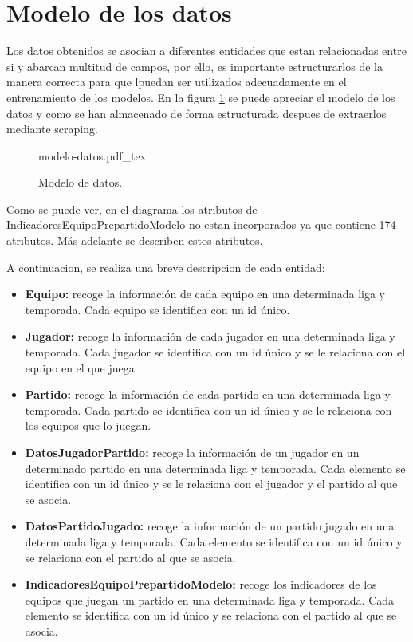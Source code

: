 \section{Modelo de los datos}
Los datos obtenidos se asocian a diferentes entidades que estan relacionadas entre si y abarcan multitud de campos, por ello, es importante estructurarlos de la manera correcta para que lpuedan ser utilizados adecuadamente en el entrenamiento de los modelos. En la figura \ref{fig:modelo-datos} se puede apreciar el modelo de los datos y como se han almacenado de forma estructurada despues de extraerlos mediante scraping.

\begin{figure}
    \centering
    \begin{normalsize}
        {modelo-datos.pdf_tex}
    \end{normalsize}
    \caption{Modelo de datos.}
    \label{fig:modelo-datos}

\end{figure}

Como se puede ver, en el diagrama los atributos de IndicadoresEquipoPrepartidoModelo no estan incorporados ya que contiene 174 atributos. Más adelante se describen estos atributos.

A continuacion, se realiza una breve descripcion de cada entidad:
\begin{itemize}
    \item \textbf{Equipo:} recoge la información de cada equipo en una determinada liga y temporada. Cada equipo se identifica con un id único.
    \item \textbf{Jugador:} recoge la información de cada jugador en una determinada liga y temporada.
          Cada jugador se identifica con un id único y se le relaciona con el equipo en el que juega.
    \item \textbf{Partido:} recoge la información de cada partido en una determinada liga y temporada. Cada
          partido se identifica con un id único y se le relaciona con los equipos que lo juegan.
    \item \textbf{DatosJugadorPartido:} recoge la información de un jugador en un determinado partido en
          una determinada liga y temporada. Cada elemento se identifica con un id único y se le
          relaciona con el jugador y el partido al que se asocia.
    \item \textbf{DatosPartidoJugado:} recoge la información de un partido jugado en una determinada liga
          y temporada. Cada elemento se identifica con un id único y se relaciona con el partido al
          que se asocia.
    \item \textbf{IndicadoresEquipoPrepartidoModelo:} recoge los indicadores de los equipos que juegan
          un partido en una determinada liga y temporada. Cada elemento se identifica con un id
          único y se relaciona con el partido al que se asocia.
\end{itemize}

